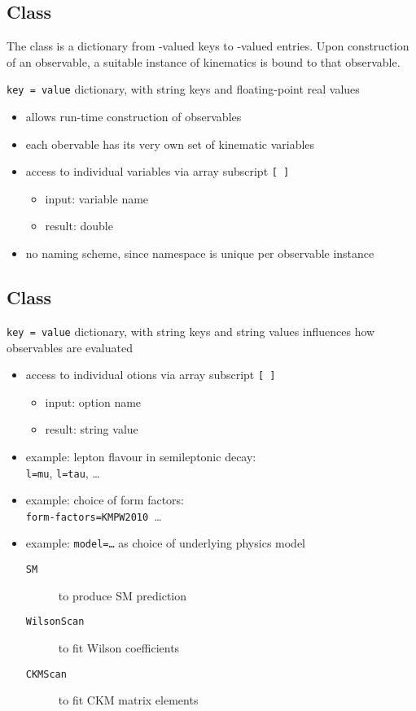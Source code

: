 \subsection{Class }

The class  is a dictionary from -valued keys to
-valued entries. Upon construction of an observable, a suitable instance
of kinematics is bound to that observable.

\texttt{key = value} dictionary, with string keys and floating-point real values

\begin{itemize}
    \item allows run-time construction of observables
    \item each obervable has its very own set of kinematic variables
    \item access to individual variables via array subscript {\texttt{[\,]}}
    \begin{itemize}
        \item input: variable name
        \item result: double
    \end{itemize}
    \item no naming scheme, since namespace is unique per observable instance
\end{itemize}

\subsection{Class }

\texttt{key = value} dictionary, with string keys and string values
influences how observables are evaluated

\begin{itemize}
    \item access to individual otions via array subscript {\texttt{[\,]}}
    \begin{itemize}
        \item input: option name
        \item result: string value
    \end{itemize}
    \item example: lepton flavour in semileptonic decay:\\
        \texttt{l=mu}, \texttt{l=tau}, \dots
    \item example: choice of form factors:\\
        \texttt{form-factors=KMPW2010}\, \dots
    \item example: \texttt{model=\dots} as choice of underlying physics model
    \begin{description}
        \item[\texttt{SM}] to produce SM prediction
        \item[\texttt{WilsonScan}] to fit Wilson coefficients
        \item[\texttt{CKMScan}] to fit CKM matrix elements
    \end{description}
\end{itemize}

